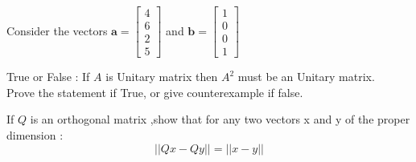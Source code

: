 \documentclass[solution,addpoints,12pt]{exam}
\begin{document}
\begin{questions}
\begin{parts}
\begin{solution}
\end{solution}
\end{parts}


\question[1] 
Consider the vectors $\mathbf{a} = \begin{bmatrix}4\\6\\2\\5\end{bmatrix}$ and $\mathbf{b} = \begin{bmatrix}1\\0\\0\\1\end{bmatrix}$

\question[1] 
True or False : If $A$ is Unitary matrix then $A^2$ must be an Unitary matrix. \\
Prove the statement if True, or give counterexample if false.  
\begin{solution}

\end{solution}

\question[1] 
If $Q$ is an orthogonal matrix ,show that for any two vectors x and y of the proper dimension : $$||Qx -Qy || = ||x -y||$$
\begin{solution}
\\~\\~\\~\\
\end{solution}



\end{questions}
\end{document}
